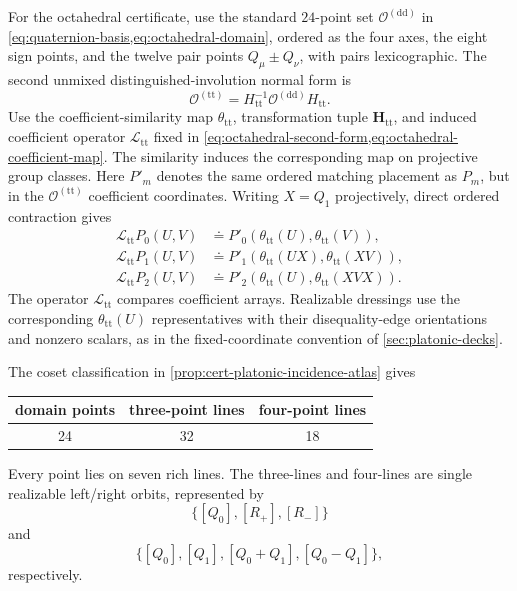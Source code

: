 \documentclass[11pt,letterpaper,onecolumn]{article}
\theoremstyle{plain}
\theoremstyle{definition}
\theoremstyle{remark}
\newcommand{\OctDD}{{\mathcal O^{(\mathrm{dd})}}}
\newcommand{\OctTT}{{\mathcal O^{(\mathrm{tt})}}}
\begin{document}
For the octahedral certificate, use the standard \(24\)-point set
\(\OctDD\) in
\cref{eq:quaternion-basis,eq:octahedral-domain}, ordered as the four axes, the
eight sign points, and the twelve pair points \(Q_\mu\pm Q_\nu\), with
pairs lexicographic. The second
unmixed distinguished-involution normal form is
\begin{equation}
 \OctTT=H_{\mathrm{tt}}^{-1}\OctDD H_{\mathrm{tt}}.
 \label{eq:cert-S4-second-form}
\end{equation}
Use the coefficient-similarity map \(\theta_{\mathrm{tt}}\), transformation
tuple \(\mathbf H_{\mathrm{tt}}\), and induced coefficient operator
\(\mathcal L_{\mathrm{tt}}\) fixed in
\cref{eq:octahedral-second-form,eq:octahedral-coefficient-map}. The
similarity induces the corresponding map on projective group classes.
Here \(P'_m\) denotes the same ordered matching placement as \(P_m\), but
in the \(\OctTT\) coefficient coordinates.
Writing \(X=Q_1\) projectively, direct ordered contraction gives
\begin{equation}
\begin{aligned}
\mathcal L_{\mathrm{tt}}P_0(U,V)&\doteq
 P'_0(\theta_{\mathrm{tt}}(U),\theta_{\mathrm{tt}}(V)),\\
\mathcal L_{\mathrm{tt}}P_1(U,V)&\doteq
 P'_1(\theta_{\mathrm{tt}}(UX),\theta_{\mathrm{tt}}(XV)),\\
\mathcal L_{\mathrm{tt}}P_2(U,V)&\doteq P'_2(\theta_{\mathrm{tt}}(U),
                                  \theta_{\mathrm{tt}}(XVX)).
\end{aligned}
\label{eq:cert-S4-coefficient-transport}
\end{equation}
The operator \(\mathcal L_{\mathrm{tt}}\) compares coefficient arrays.
Realizable dressings use the corresponding \(\theta_{\mathrm{tt}}(U)\)
representatives with their disequality-edge orientations and nonzero scalars,
as in the fixed-coordinate convention of \cref{sec:platonic-decks}.

The coset classification in \cref{prop:cert-platonic-incidence-atlas} gives
\begin{center}
\normalsize
\begin{tabular}{c@{\qquad}c@{\qquad}c}
\toprule
domain points&three-point lines&four-point lines\\
\midrule
24&32&18\\
\bottomrule
\end{tabular}
\end{center}
Every point lies on seven rich lines.  The three-lines and
four-lines are single realizable left/right orbits, represented by
\[
 \{[Q_0],[R_+],[R_-]\}
\]
and
\[
 \{[Q_0],[Q_1],[Q_0+Q_1],[Q_0-Q_1]\},
\]
respectively.
\end{document}
